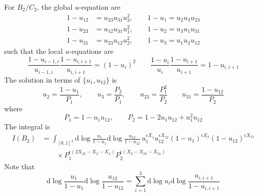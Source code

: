 \documentclass[12pt]{article}
\theoremstyle{definition}
\theoremstyle{plain}
\newcommand{\dif}{\mathrm{d}} %
\begin{document}
For $B_{2}/C_{2}$, the global $u$-equation are 
\begin{align}
    1-u_{12}&=u_{23}u_{31}u_{3}^{2}, \qquad 1-u_{1}=u_{2}u_{3}u_{23} \nonumber \\
    1-u_{23}&=u_{12}u_{31}u_{1}^{2}, \qquad 1-u_{2}=u_{3}u_{1}u_{31}  \\
    1-u_{31}&=u_{23}u_{12}u_{2}^{2}, \qquad 1-u_{3}=u_{1}u_{2}u_{12} \nonumber
\end{align}
such that the local $u$-equations are
\begin{equation*}
\frac{1-u_{i-1,i}}{u_{i-1,i}}\frac{1-u_{i,i+1}}{u_{i,i+1}}= (1-u_{i})^{2} \qquad 
\frac{1-u_{i}}{u_{i}}\frac{1-u_{i+1}}{u_{i+1}} = 1-u_{i,i+1}
\end{equation*}
The solution in terms of $\{u_{1},u_{12}\}$ is 
\begin{equation}
u_{2}=\frac{1-u_{1}}{P_{1}},\qquad u_{3}=\frac{P_{2}}{P_{1}},\qquad u_{23}=\frac{P_{1}^{2}}{P_{2}} \qquad u_{31}=\frac{1-u_{12}}{P_{2}}  
\end{equation}
where 
\begin{equation}
    P_{1}=1-u_{1}u_{12},\qquad P_{2}=1-2u_{1}u_{12}+u_{1}^{2}u_{12} \label{B2pol}
\end{equation}
The integral is 
\begin{align}
    I(B_{2})&=\int_{[0,1]^{2}}\dif\log\frac{u_{1}}{1-u_{1}}\dif\log\frac{u_{12}}{1-u_{12}}\,u_{1}^{\epsilon X_{1}} u_{12}^{\epsilon X_{12}}
    (1-u_{1})^{\epsilon X_{2}}(1-u_{12})^{\epsilon X_{31}} \nonumber\\
   &\qquad \times P_{1}^{\epsilon(2X_{23}-X_{2}-X_{3})}P_{2}^{\epsilon(X_{3}-X_{23}-X_{31})}
\end{align}
Note that
\begin{equation}
    \dif\log\frac{u_{1}}{1-u_{1}}\dif\log\frac{u_{12}}{1-u_{12}}
    =\sum_{i=1}^{3}\dif\log u_{i}\dif\log\frac{u_{i,i+1}}{1-u_{i,i+1}}
\end{equation}
\end{document}
